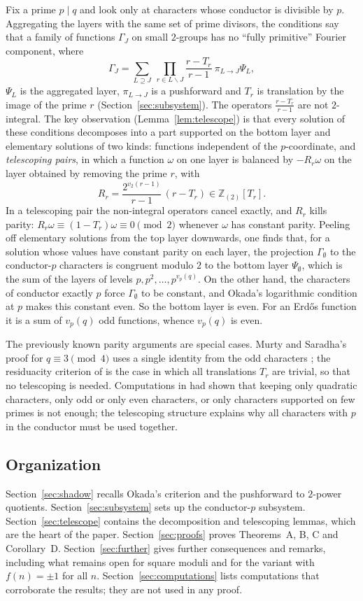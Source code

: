 \documentclass[11pt]{amsart}
\theoremstyle{definition}
\theoremstyle{remark}
\newcommand{\Zt}{\mathbb Z_{(2)}}
\numberwithin{equation}{section}
\begin{document}
Fix a prime $p\mid q$ and look only at characters whose conductor is divisible by $p$.
Aggregating the layers with the same set of prime divisors, the conditions say that a family of functions $\Gamma_J$ on small $2$-groups has no ``fully primitive'' Fourier component, where
\[
\Gamma_J=\sum_{L\supseteq J}\ \prod_{r\in L\smallsetminus J}\frac{r-T_r}{r-1}\ \pi_{L\to J}\Psi_L,
\]
$\Psi_L$ is the aggregated layer, $\pi_{L\to J}$ is a pushforward and $T_r$ is translation by the image of the prime $r$ (Section~\ref{sec:subsystem}).
The operators $\frac{r-T_r}{r-1}$ are not $2$-integral.
The key observation (Lemma~\ref{lem:telescope}) is that every solution of these conditions decomposes into a part supported on the bottom layer and elementary solutions of two kinds: functions independent of the $p$-coordinate, and \emph{telescoping pairs}, in which a function $\omega$ on one layer is balanced by $-R_r\omega$ on the layer obtained by removing the prime $r$, with
\[
R_r=\frac{2^{v_2(r-1)}}{r-1}\,(r-T_r)\in\Zt[T_r].
\]
In a telescoping pair the non-integral operators cancel exactly, and $R_r$ kills parity: $R_r\omega\equiv(1-T_r)\omega\equiv0\pmod2$ whenever $\omega$ has constant parity.
Peeling off elementary solutions from the top layer downwards, one finds that, for a solution whose values have constant parity on each layer, the projection $\Gamma_\emptyset$ to the conductor-$p$ characters is congruent modulo $2$ to the bottom layer $\Psi_\emptyset$, which is the sum of the layers of levels $p,p^2,\dots,p^{v_p(q)}$.
On the other hand, the characters of conductor exactly $p$ force $\Gamma_\emptyset$ to be constant, and Okada's logarithmic condition at $p$ makes this constant even.
So the bottom layer is even.
For an Erd\H{o}s function it is a sum of $v_p(q)$ odd functions, whence $v_p(q)$ is even.

The previously known parity arguments are special cases.
Murty and Saradha's proof for $q\equiv3\pmod4$ uses a single identity from the odd characters \cite{MS10,Kei26}; the residuacity criterion of \cite{Kei26} is the case in which all translations $T_r$ are trivial, so that no telescoping is needed.
Computations in \cite{Kei26} had shown that keeping only quadratic characters, only odd or only even characters, or only characters supported on few primes is not enough; the telescoping structure explains why all characters with $p$ in the conductor must be used together.

\subsection{Organization}
Section~\ref{sec:shadow} recalls Okada's criterion and the pushforward to $2$-power quotients.
Section~\ref{sec:subsystem} sets up the conductor-$p$ subsystem.
Section~\ref{sec:telescope} contains the decomposition and telescoping lemmas, which are the heart of the paper.
Section~\ref{sec:proofs} proves Theorems~A, B, C and Corollary~D.
Section~\ref{sec:further} gives further consequences and remarks, including what remains open for square moduli and for the variant with $f(n)=\pm1$ for all $n$.
Section~\ref{sec:computations} lists computations that corroborate the results; they are not used in any proof.
\end{document}
